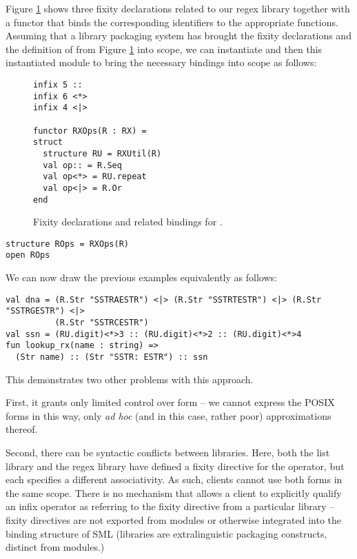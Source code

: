 Figure \ref{fig:infix-RX} shows three fixity declarations related to our regex library together with a functor  that binds the corresponding identifiers to the appropriate functions. Assuming that a library packaging system has brought the fixity declarations and the definition of  from Figure \ref{fig:infix-RX} into scope, we can instantiate  and then  this instantiated module to bring the necessary bindings into scope as follows:


\begin{figure}
\begin{lstlisting}
infix 5 ::
infix 6 <*>
infix 4 <|>

functor RXOps(R : RX) =
struct 
  structure RU = RXUtil(R)
  val op:: = R.Seq
  val op<*> = RU.repeat
  val op<|> = R.Or
end
\end{lstlisting}
\caption{Fixity declarations and related bindings for .}
\label{fig:infix-RX}
\end{figure}
\begin{lstlisting}[numbers=none]
structure ROps = RXOps(R)
open ROps
\end{lstlisting}
We can now draw the previous examples equivalently as follows:
\begin{lstlisting}[numbers=none]
val dna = (R.Str "SSTRAESTR") <|> (R.Str "SSTRTESTR") <|> (R.Str "SSTRGESTR") <|> 
          (R.Str "SSTRCESTR")
val ssn = (RU.digit)<*>3 :: (RU.digit)<*>2 :: (RU.digit)<*>4
fun lookup_rx(name : string) => 
  (Str name) :: (Str "SSTR: ESTR") :: ssn
\end{lstlisting}

This demonstrates two other problems with this approach. 

First, it grants only limited control over form -- we cannot express the POSIX forms in this way, only \emph{ad hoc} (and in this case, rather poor) approximations thereof. 

Second, there can be syntactic conflicts between libraries. Here, both the list library and the regex library have defined a fixity directive for the \li{::} operator, but each specifies a  different associativity. As such, clients cannot use both forms in the same scope. There is no mechanism that allows a client to explicitly qualify an infix operator as referring to the fixity directive from a particular library -- fixity directives are  not exported from modules or otherwise integrated into the binding structure of SML (libraries are extralinguistic packaging constructs, distinct from modules.) 

